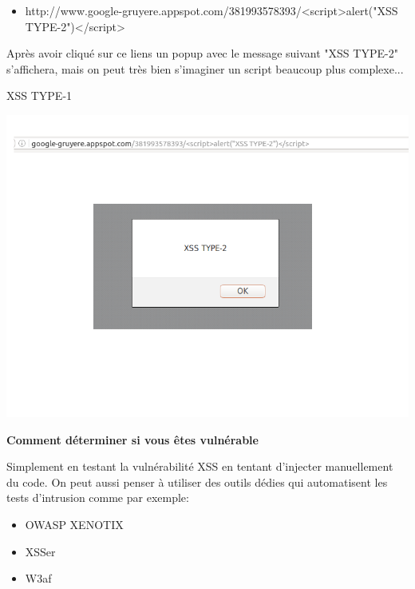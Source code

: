 \begin{itemize}
\bigskip

\begin{itemize}
\item http://www.google-gruyere.appspot.com/381993578393/<script>alert("XSS TYPE-2")</script>
\end{itemize}

\begin{flushleft}
Après avoir cliqué sur ce liens un popup avec le message suivant "XSS TYPE-2" s'affichera, mais on peut très bien s'imaginer un script beaucoup plus complexe...
\end{flushleft} 

\bigskip

\begin{center}
\caption{XSS TYPE-1}
\includegraphics[scale=0.3]{Web/assets/xsst2.png}
\end{center}

\bigskip

\begin{flushleft}
\textbf{Comment déterminer si vous êtes vulnérable}

\smallskip

Simplement en testant la vulnérabilité XSS en tentant d'injecter manuellement du code. On peut aussi penser à utiliser des outils dédies qui automatisent les tests d'intrusion comme par exemple:
\end{flushleft}

\bigskip

\begin{itemize}
\item OWASP XENOTIX
\item XSSer
\item W3af
\end{itemize}


\end{itemize}
